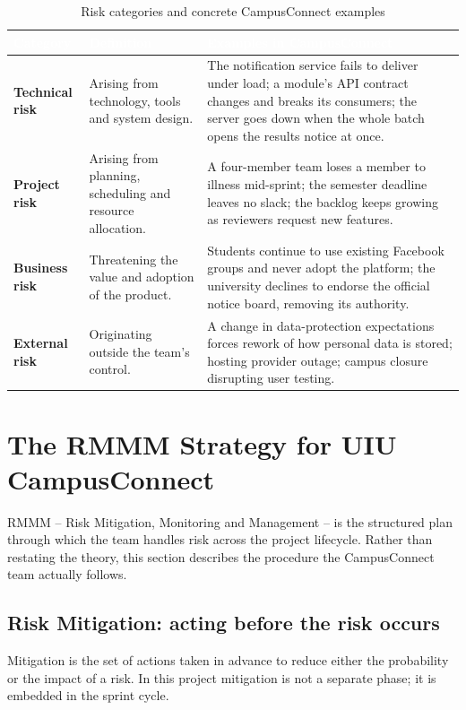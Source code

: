 \documentclass[11pt,a4paper]{report}
\newcommand{\thead}[1]{\textcolor{white}{\sffamily\bfseries #1}}
\newcommand{\rowhead}{\rowcolor{headRow}}
\begin{document}
\begin{table}[htbp]
\centering
\caption{Risk categories and concrete CampusConnect examples}
\label{tab:riskcat}
\begin{tabular}{|L{2.7cm}|L{4.0cm}|L{7.7cm}|}
\hline
\rowhead \thead{Category} & \thead{Definition} & \thead{Examples in CampusConnect} \\ \hline
\textbf{Technical risk} &
Arising from technology, tools and system design. &
The notification service fails to deliver under load; a module's API contract
changes and breaks its consumers; the server goes down when the whole batch
opens the results notice at once. \\ \hline
{}
\textbf{Project risk} &
Arising from planning, scheduling and resource allocation. &
A four-member team loses a member to illness mid-sprint; the semester deadline
leaves no slack; the backlog keeps growing as reviewers request new features. \\ \hline
\textbf{Business risk} &
Threatening the value and adoption of the product. &
Students continue to use existing Facebook groups and never adopt the platform;
the university declines to endorse the official notice board, removing its
authority. \\ \hline
{}
\textbf{External risk} &
Originating outside the team's control. &
A change in data-protection expectations forces rework of how personal data is
stored; hosting provider outage; campus closure disrupting user testing. \\ \hline
\end{tabular}
\end{table}

\section{The RMMM Strategy for UIU CampusConnect}

RMMM -- Risk Mitigation, Monitoring and Management -- is the structured plan
through which the team handles risk across the project lifecycle. Rather than
restating the theory, this section describes the procedure the CampusConnect
team actually follows.

\subsection{Risk Mitigation: acting before the risk occurs}

Mitigation is the set of actions taken in advance to reduce either the
probability or the impact of a risk. In this project mitigation is not a
separate phase; it is embedded in the sprint cycle.
\end{document}
